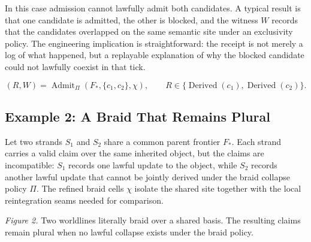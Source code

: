 \documentclass[11pt]{article}
\theoremstyle{definition}
\theoremstyle{plain}
\theoremstyle{remark}
\begin{document}
In this case admission cannot lawfully admit both candidates. A typical result is that one candidate is admitted, the other is blocked, and the witness \(W\) records that the candidates overlapped on the same semantic site under an exclusivity policy. The engineering implication is straightforward: the receipt is not merely a log of what happened, but a replayable explanation of why the blocked candidate could not lawfully coexist in that tick.

\[
(R, W)
=
\operatorname{Admit}_{\Pi}(F_*, \{c_1, c_2\}, \chi),
\qquad
R \in \{\operatorname{Derived}(c_1), \operatorname{Derived}(c_2)\}.
\]

\subsection{Example 2: A Braid That Remains Plural}

Let two strands \(S_1\) and \(S_2\) share a common parent frontier \(F_*\). Each strand carries a valid claim over the same inherited object, but the claims are incompatible: \(S_1\) records one lawful update to the object, while \(S_2\) records another lawful update that cannot be jointly derived under the braid collapse policy \(\Pi\). The refined braid cells \(\chi\) isolate the shared site together with the local reintegration seams needed for comparison.

\begin{center}

\smallskip
\emph{Figure 2.} Two worldlines literally braid over a shared basis. The resulting claims remain plural when no lawful collapse exists under the braid policy.
\end{center}
\end{document}
